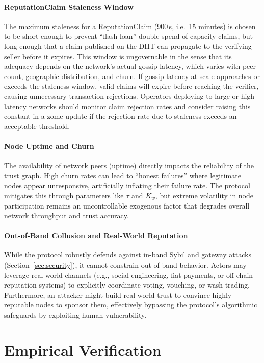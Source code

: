 \documentclass[11pt]{article}
\begin{document}
\paragraph{ReputationClaim Staleness Window}
The maximum staleness for a ReputationClaim ($900$\,s, i.e.\ 15 minutes) is chosen to be short enough to prevent ``flash-loan'' double-spend of capacity claims, but long enough that a claim published on the DHT can propagate to the verifying seller before it expires. This window is ungovernable in the sense that its adequacy depends on the network's actual gossip latency, which varies with peer count, geographic distribution, and churn. If gossip latency at scale approaches or exceeds the staleness window, valid claims will expire before reaching the verifier, causing unnecessary transaction rejections. Operators deploying to large or high-latency networks should monitor claim rejection rates and consider raising this constant in a zome update if the rejection rate due to staleness exceeds an acceptable threshold.

\paragraph{Node Uptime and Churn}
The availability of network peers (uptime) directly impacts the reliability of the trust graph. High churn rates can lead to ``honest failures'' where legitimate nodes appear unresponsive, artificially inflating their failure rate. The protocol mitigates this through parameters like $\tau$ and $K_w$, but extreme volatility in node participation remains an uncontrollable exogenous factor that degrades overall network throughput and trust accuracy.

\paragraph{Out-of-Band Collusion and Real-World Reputation}
While the protocol robustly defends against in-band Sybil and gateway attacks (Section~\ref{sec:security}), it cannot constrain out-of-band behavior. Actors may leverage real-world channels (e.g., social engineering, fiat payments, or off-chain reputation systems) to explicitly coordinate voting, vouching, or wash-trading. Furthermore, an attacker might build real-world trust to convince highly reputable nodes to sponsor them, effectively bypassing the protocol's algorithmic safeguards by exploiting human vulnerability.

\section{Empirical Verification}
\label{sec:verification}
\end{document}
